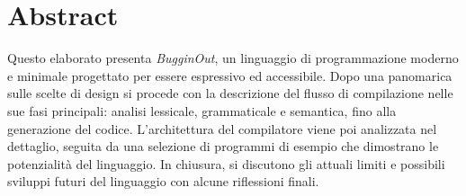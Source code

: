 \chapter*{Abstract}

Questo elaborato presenta \textit{BugginOut}, un linguaggio di programmazione moderno e minimale progettato per essere espressivo ed accessibile. Dopo una panomarica sulle scelte di design si procede con la descrizione del flusso di compilazione nelle sue fasi principali: analisi lessicale, grammaticale e semantica, fino alla generazione del codice. L'architettura del compilatore viene poi analizzata nel dettaglio, seguita da una selezione di programmi di esempio che dimostrano le potenzialità del linguaggio. In chiusura, si discutono gli attuali limiti e possibili sviluppi futuri del linguaggio con alcune riflessioni finali.
